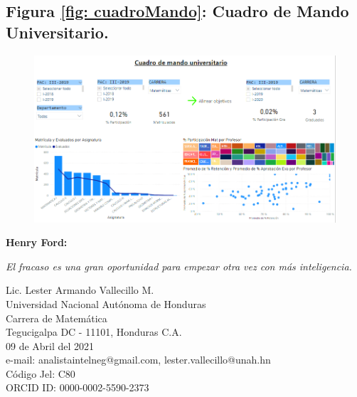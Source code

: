 \documentclass[12pt,jou]{apa7}
\begin{document}
\subsection{Figura \ref{fig: cuadroMando}: Cuadro de Mando Universitario.}
\begin{figure}[h] \label{cuadroMando}
\centering
\includegraphics[width=0.92\linewidth]{Figuras/cuadroMando}
\end{figure}


\vspace*{2cm}
\textbf{Henry Ford:\\}
\begin{center}
	\textit{El fracaso es una gran oportunidad para empezar otra vez con más inteligencia.}
\end{center}
\vspace*{3cm}
\begin{flushleft}
Lic. Lester Armando Vallecillo M.\\
Universidad Nacional Autónoma de Honduras\\
Carrera de Matemática\\
Tegucigalpa DC - 11101, Honduras C.A.\\
09 de Abril del 2021\\
e-mail: analistaintelneg@gmail.com, lester.vallecillo@unah.hn\\
Código Jel: C80\\
ORCID ID: 0000-0002-5590-2373
\end{flushleft}
\end{document}
